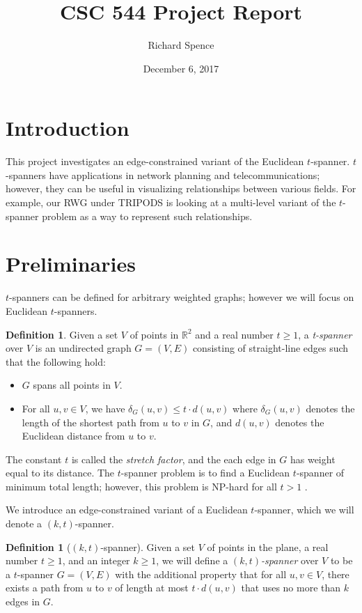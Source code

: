 \documentclass[12pt]{article}
\title{CSC 544 Project Report}
\author{Richard Spence}
\date{December 6, 2017}
\theoremstyle{definition}
\newtheorem{definition}[theorem]{Definition}
\begin{document}
\maketitle

\section{Introduction}
This project investigates an edge-constrained variant of the Euclidean $t$-spanner. $t$-spanners have applications in network planning and telecommunications; however, they can be useful in visualizing relationships between various fields. For example, our RWG under TRIPODS is looking at a multi-level variant of the $t$-spanner problem as a way to represent such relationships.

\section{Preliminaries}
$t$-spanners can be defined for arbitrary weighted graphs; however we will focus on Euclidean $t$-spanners.

\begin{definition}
Given a set $V$ of points in $\mathbb{R}^2$ and a real number $t \ge 1$, a \emph{t-spanner} over $V$ is an undirected graph $G = (V, E)$ consisting of straight-line edges such that the following hold:

\begin{itemize}
\item $G$ spans all points in $V$.
\item For all $u, v \in V$, we have $\delta_{G}(u,v) \le t \cdot d(u,v)$ where $\delta_G(u,v)$ denotes the length of the shortest path from $u$ to $v$ in $G$, and $d(u,v)$ denotes the Euclidean distance from $u$ to $v$.
\end{itemize}
\end{definition}

The constant $t$ is called the \emph{stretch factor}, and the each edge in $G$ has weight equal to its distance. The $t$-spanner problem is to find a Euclidean $t$-spanner of minimum total length; however, this problem is NP-hard for all $t > 1$ \cite{Carmi}.


We introduce an edge-constrained variant of a Euclidean $t$-spanner, which we will denote a $(k,t)$-spanner.

\begin{definition}[$(k,t)$-spanner] Given a set $V$ of points in the plane, a real number $t \ge 1$, and an integer $k \ge 1$, we will define a \emph{$(k,t)$-spanner} over $V$ to be a $t$-spanner $G = (V,E)$ with the additional property that for all $u,v \in V$, there exists a path from $u$ to $v$ of length at most $t \cdot d(u,v)$ that uses no more than $k$ edges in $G$.
\end{definition}
\end{document}

